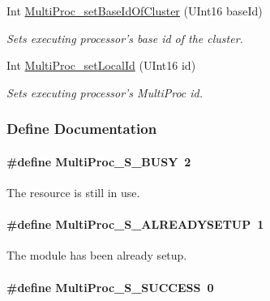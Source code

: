 \begin{DoxyCompactItemize}
Int \hyperlink{_multi_proc_8h_ae8ca0f1d758d428d9f06f56badee7f0c}{MultiProc\_\-setBaseIdOfCluster} (UInt16 baseId)
\begin{DoxyCompactList}\small\item\em Sets executing processor's base id of the cluster. \item\end{DoxyCompactList}\item 
Int \hyperlink{_multi_proc_8h_a4a00561c7a3f5f91b7ab7e1b4c3fb1ef}{MultiProc\_\-setLocalId} (UInt16 id)
\begin{DoxyCompactList}\small\item\em Sets executing processor's MultiProc id. \item\end{DoxyCompactList}\end{DoxyCompactItemize}


\subsubsection{Define Documentation}
\paragraph[{MultiProc\_\-S\_\-BUSY}]{\setlength{\rightskip}{0pt plus 5cm}\#define MultiProc\_\-S\_\-BUSY~2}\hfill\label{_multi_proc_8h_a419e76c904cc23e3ab274bd49d4ba2f0}


The resource is still in use. 

\paragraph[{MultiProc\_\-S\_\-ALREADYSETUP}]{\setlength{\rightskip}{0pt plus 5cm}\#define MultiProc\_\-S\_\-ALREADYSETUP~1}\hfill\label{_multi_proc_8h_a67c6af51e4eee99a2e57b498ba943366}


The module has been already setup. 

\paragraph[{MultiProc\_\-S\_\-SUCCESS}]{\setlength{\rightskip}{0pt plus 5cm}\#define MultiProc\_\-S\_\-SUCCESS~0}\hfill\label{_multi_proc_8h_a88ef69134ed8907ec46443a8c5445acd}


